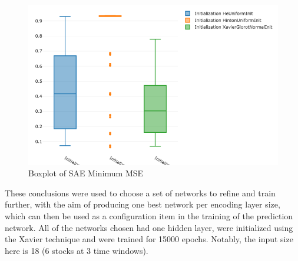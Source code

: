 \documentclass[a4paper,latin]{paper}
\begin{document}
\begin{figure}[H]
	\centering \includegraphics[scale=0.5]{images/synthetic_results/boxplot_sae_init.png}
	\caption{Boxplot of SAE Minimum MSE}
	\label{figure-synthetic-sae-init}
\end{figure}

These conclusions were used to choose a set of networks to refine and train further, with the aim of producing one best network per encoding layer size, which can then be used as a configuration item in the training of the prediction network. All of the networks chosen had one hidden layer, were initialized using the Xavier technique and were trained for 15000 epochs. Notably, the input size here is 18 (6 stocks at 3 time windows).
\end{document}
